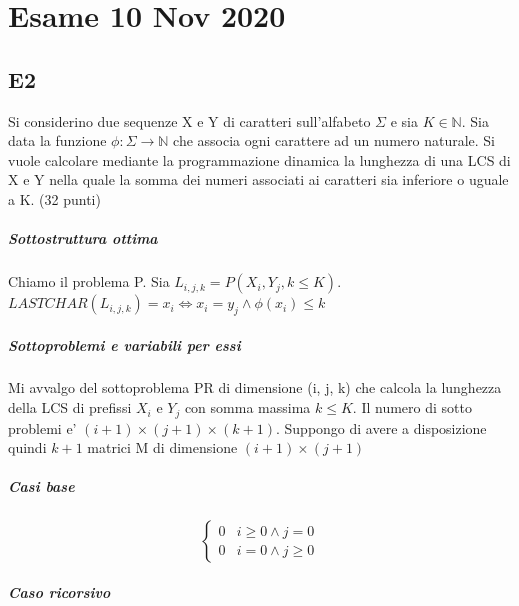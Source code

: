 \chapter{Esame 10 Nov 2020}

\section{E2}

Si considerino due sequenze X e Y di caratteri sull'alfabeto $\Sigma$ e sia $K \in \mathbb{N}$.
Sia data la funzione $\phi : \Sigma \rightarrow \mathbb{N}$ che associa ogni carattere ad un numero naturale.
Si vuole calcolare mediante la programmazione dinamica la lunghezza di una LCS di X e Y nella quale la somma dei numeri associati ai caratteri sia inferiore o uguale a K. (32 punti)

\paragraph{Sottostruttura ottima}

Chiamo il problema P. Sia $L_{i,j,k} = P(X_i, Y_j, k \leq K)$. \\

$LASTCHAR(L_{i,j,k}) = x_i \Leftrightarrow x_i = y_j \land \phi(x_i) \leq k$

\paragraph{Sottoproblemi e variabili per essi}

Mi avvalgo del sottoproblema PR di dimensione (i, j, k) che calcola la lunghezza della LCS di prefissi $X_i$ e $Y_j$ con somma massima $k \leq K$.
Il numero di sotto problemi e' $(i + 1) \times (j + 1) \times (k + 1)$.
Suppongo di avere a disposizione quindi $k+1$ matrici M di dimensione $(i + 1) \times (j + 1)$

\paragraph{Casi base}

\[
    \begin{cases}
        0 & i \geq 0 \land j = 0\\
        0 & i = 0 \land j \geq 0
    \end{cases}
\]

\paragraph{Caso ricorsivo}

